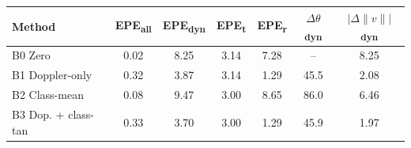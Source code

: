 \begin{tabular}{lcccccc}
\toprule
Method & EPE\textsubscript{all} & EPE\textsubscript{dyn} & \textbf{EPE\textsubscript{t}} & EPE\textsubscript{r} & $\Delta\theta$\textsubscript{dyn} & $|\Delta\|v\||$\textsubscript{dyn} \\
\midrule
B0 Zero & 0.02 & 8.25 & 3.14 & 7.28 & -- & 8.25 \\
B1 Doppler-only & 0.32 & 3.87 & 3.14 & 1.29 & 45.5 & 2.08 \\
B2 Class-mean & 0.08 & 9.47 & 3.00 & 8.65 & 86.0 & 6.46 \\
B3 Dop. + class-tan & 0.33 & 3.70 & 3.00 & 1.29 & 45.9 & 1.97 \\
\bottomrule
\end{tabular}
